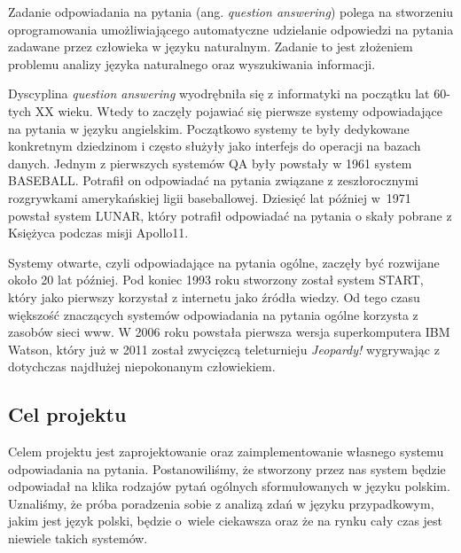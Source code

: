 
Zadanie odpowiadania na pytania (ang. \emph{question answering}) polega na stworzeniu oprogramowania umożliwiającego automatyczne udzielanie odpowiedzi na pytania zadawane przez człowieka w języku naturalnym. Zadanie to jest złożeniem problemu analizy języka naturalnego oraz wyszukiwania informacji.

Dyscyplina \emph{question answering} wyodrębniła się z informatyki na początku lat 60-tych XX wieku. Wtedy to zaczęły pojawiać się pierwsze systemy odpowiadające na pytania w języku angielskim. Początkowo systemy te były dedykowane konkretnym dziedzinom i często służyły jako interfejs do operacji na bazach danych. Jednym z pierwszych systemów QA były powstały w 1961 system BASEBALL. Potrafił on odpowiadać na pytania związane z zeszłorocznymi rozgrywkami amerykańskiej ligii baseballowej. Dziesięć lat później w~1971 powstał system LUNAR, który potrafił odpowiadać na pytania o skały pobrane z Księżyca podczas misji Apollo11. 

Systemy otwarte, czyli odpowiadające na pytania ogólne, zaczęły być rozwijane około 20 lat później. Pod koniec 1993 roku stworzony został system START, który jako pierwszy korzystał z internetu jako źródła wiedzy. Od tego czasu większość znaczących systemów odpowiadania na pytania ogólne korzysta z zasobów sieci www. W 2006 roku powstała pierwsza wersja superkomputera IBM Watson, który już w 2011 został zwycięzcą teleturnieju \emph{Jeopardy!} wygrywając z dotychczas najdłużej niepokonanym człowiekiem.

\subsection{Cel projektu}\label{subsec:wpr:cel}
Celem projektu jest zaprojektowanie oraz zaimplementowanie własnego systemu odpowiadania na pytania. Postanowiliśmy, że stworzony przez nas system będzie odpowiadał na klika rodzajów pytań ogólnych sformułowanych w języku polskim. Uznaliśmy, że próba poradzenia sobie z analizą zdań w języku przypadkowym, jakim jest język polski, będzie o~wiele ciekawsza oraz że na rynku cały czas jest niewiele takich systemów. 



